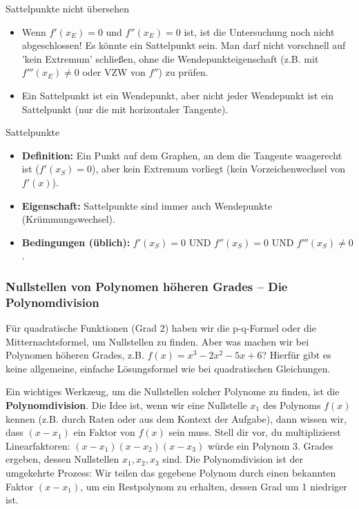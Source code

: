 \begin{fehlerboxumgebung}{Sattelpunkte nicht übersehen}
\begin{itemize}
    \item Wenn $f'(x_E)=0$ und $f''(x_E)=0$ ist, ist die Untersuchung noch nicht abgeschlossen! Es könnte ein Sattelpunkt sein. Man darf nicht vorschnell auf 'kein Extremum' schließen, ohne die Wendepunkteigenschaft (z.B. mit $f'''(x_E) \neq 0$ oder VZW von $f''$) zu prüfen.
    \item Ein Sattelpunkt ist ein Wendepunkt, aber nicht jeder Wendepunkt ist ein Sattelpunkt (nur die mit horizontaler Tangente).
\end{itemize}
\end{fehlerboxumgebung}

\begin{kurzknappumgebung}{Sattelpunkte}
\begin{itemize}
    \item \textbf{Definition:} Ein Punkt auf dem Graphen, an dem die Tangente waagerecht ist ($f'(x_S)=0$), aber kein Extremum vorliegt (kein Vorzeichenwechsel von $f'(x)$).
    \item \textbf{Eigenschaft:} Sattelpunkte sind immer auch Wendepunkte (Krümmungswechsel).
    \item \textbf{Bedingungen (üblich):} $f'(x_S)=0$ UND $f''(x_S)=0$ UND $f'''(x_S) \neq 0$.
\end{itemize}
\end{kurzknappumgebung}








\subsubsection{Nullstellen von Polynomen höheren Grades – Die Polynomdivision}
\label{subsubsec:polynomdivision}

Für quadratische Funktionen (Grad 2) haben wir die p-q-Formel oder die Mitternachtsformel, um Nullstellen zu finden. Aber was machen wir bei Polynomen höheren Grades, z.B. $f(x) = x^3 - 2x^2 - 5x + 6$? Hierfür gibt es keine allgemeine, einfache Lösungsformel wie bei quadratischen Gleichungen.

Ein wichtiges Werkzeug, um die Nullstellen solcher Polynome zu finden, ist die \textbf{Polynomdivision}. Die Idee ist, wenn wir eine Nullstelle $x_1$ des Polynoms $f(x)$ kennen (z.B. durch Raten oder aus dem Kontext der Aufgabe), dann wissen wir, dass $(x-x_1)$ ein Faktor von $f(x)$ sein muss.
Stell dir vor, du multiplizierst Linearfaktoren: $(x-x_1)(x-x_2)(x-x_3)$ würde ein Polynom 3. Grades ergeben, dessen Nullstellen $x_1, x_2, x_3$ sind. Die Polynomdivision ist der umgekehrte Prozess: Wir teilen das gegebene Polynom durch einen bekannten Faktor $(x-x_1)$, um ein Restpolynom zu erhalten, dessen Grad um 1 niedriger ist.

